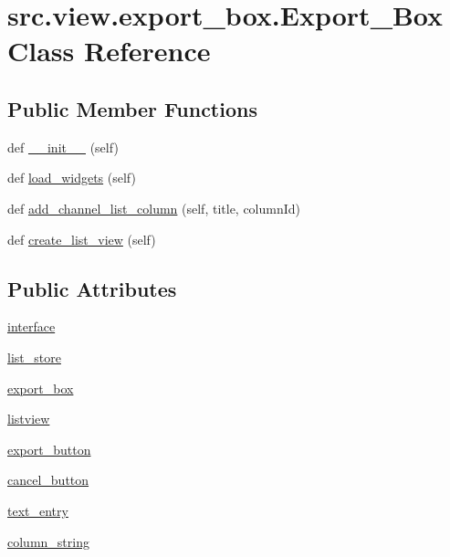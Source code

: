 \hypertarget{classsrc_1_1view_1_1export__box_1_1Export__Box}{}\section{src.\+view.\+export\+\_\+box.\+Export\+\_\+\+Box Class Reference}
\label{classsrc_1_1view_1_1export__box_1_1Export__Box}
\subsection*{Public Member Functions}
\begin{DoxyCompactItemize}
\item 
def \hyperlink{classsrc_1_1view_1_1export__box_1_1Export__Box_ada19335761501a6d4f434146ecc97158}{\+\_\+\+\_\+init\+\_\+\+\_\+} (self)
\item 
def \hyperlink{classsrc_1_1view_1_1export__box_1_1Export__Box_ac333f6fdd40bf2349b9780333d983cbd}{load\+\_\+widgets} (self)
\item 
def \hyperlink{classsrc_1_1view_1_1export__box_1_1Export__Box_a2158ef4ddbc92c315bac9c9f065ddd07}{add\+\_\+channel\+\_\+list\+\_\+column} (self, title, column\+Id)
\item 
def \hyperlink{classsrc_1_1view_1_1export__box_1_1Export__Box_ac45a8c69e4e5e425f966ad07bcf31c52}{create\+\_\+list\+\_\+view} (self)
\end{DoxyCompactItemize}
\subsection*{Public Attributes}
\begin{DoxyCompactItemize}
\item 
\hyperlink{classsrc_1_1view_1_1export__box_1_1Export__Box_a04e81aa445620822397953c0fa3276f8}{interface}
\item 
\hyperlink{classsrc_1_1view_1_1export__box_1_1Export__Box_a9914ddf2315d31a118cd2f09f65f4ce9}{list\+\_\+store}
\item 
\hyperlink{classsrc_1_1view_1_1export__box_1_1Export__Box_aaa8b2ffcbcfbfb4a35e071da47409f3b}{export\+\_\+box}
\item 
\hyperlink{classsrc_1_1view_1_1export__box_1_1Export__Box_a8592732aeaa91ca10fe5dda340981259}{listview}
\item 
\hyperlink{classsrc_1_1view_1_1export__box_1_1Export__Box_aa98bee95ddcf1a265e3c90c4398fb79b}{export\+\_\+button}
\item 
\hyperlink{classsrc_1_1view_1_1export__box_1_1Export__Box_a999e9883f63f4f34312015b01cd0e28f}{cancel\+\_\+button}
\item 
\hyperlink{classsrc_1_1view_1_1export__box_1_1Export__Box_a94d8549aa604bd891b9f5de86f5a6f3e}{text\+\_\+entry}
\item 
\hyperlink{classsrc_1_1view_1_1export__box_1_1Export__Box_adb064561924b8f67b4537161d584401b}{column\+\_\+string}
\end{DoxyCompactItemize}



